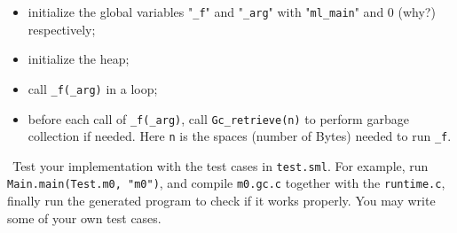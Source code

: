 \documentclass{article}
\theoremstyle{definition}
\theoremstyle{remark}
\numberwithin{equation}{section}
\begin{document}
{{{\begin{itemize}
\begin{itemize}
     \item initialize the global variables "\texttt{\_f}" and "\texttt{\_arg}" with
     "\texttt{ml\_main}" and 0 (why?) respectively;
     \item initialize the heap;
     \item call \texttt{\_f(\_arg)} in a loop;
     \item before each call of \texttt{\_f(\_arg)}, call \texttt{Gc\_retrieve(n)}
     to perform garbage collection if needed. Here \texttt{n} is the spaces (number
     of Bytes) needed to run \texttt{\_f}.
   \end{itemize}
 \end{itemize}
  $\ \ $Test your implementation with the test cases in \texttt{test.sml}. For example,
   run \texttt{Main.main(Test.m0, "m0")}, and compile \texttt{m0.gc.c} together with 
   the \texttt{runtime.c},
   finally run the generated program to check if it works properly. You may write some
   of your own test cases.
}
}
}
\end{document}
